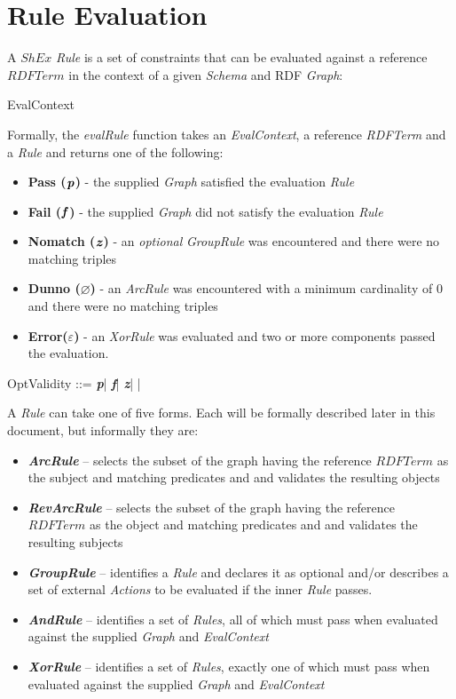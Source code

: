 \documentclass[fuzz]{llncs}
\def\pass{\textbf{\textit{p}}}
\def\fail{\textbf{\textit{f}}}
\def\dunno{\varnothing}
\def\error{\varepsilon}
\def\nomatch{\textbf{\textit{z}}}
\def\zc{\textit}
\begin{document}
\section{Rule Evaluation}
A $ShEx$ \zc{Rule} is a set of constraints that can be evaluated against a reference ${RDFTerm}$
 in the context of a given \zc{Schema} and RDF \zc{Graph}:
\begin{zed}
EvalContext  \\
\end{zed}


Formally, the \zc{evalRule} function takes an \zc{EvalContext}, a reference \zc{RDFTerm} and a \zc{Rule} and returns one of the following:
\begin{itemize}
\item \textbf{Pass ($\pass$)} - the supplied \zc{Graph} satisfied the evaluation \zc{Rule}
\item \textbf{Fail ($\fail$)} - the supplied \zc{Graph} did not satisfy the evaluation \zc{Rule}
\item \textbf{Nomatch ($\nomatch$)} - an \zc{optional} \zc{GroupRule} was encountered and there were no matching triples
\item \textbf{Dunno ($\dunno$)} - an \zc{ArcRule} was encountered with a minimum cardinality of 0 and there were no matching triples
\item \textbf{Error($\error$)} - an \zc{XorRule} was evaluated and two or more components passed the evaluation.
\end{itemize}
\begin{zed}
OptValidity ::= \pass | \fail | \nomatch | \dunno | \error \\
\end{zed}
A  \zc{Rule} can take one of five forms. Each will be formally described later in this
document, but informally they are:
\begin{itemize}
\item \textbf{\zc{ArcRule}} -- selects the subset of the graph having the reference ${RDFTerm}$ as the subject and matching predicates and and validates the resulting objects
\item \textbf{\zc{RevArcRule}} -- selects the subset of the graph having the reference ${RDFTerm}$ as the object and matching predicates and and validates the resulting subjects 
\item \textbf{\zc{GroupRule}} -- identifies a \zc{Rule} and declares it as optional and/or
describes a set of external \zc{Actions} to be evaluated if the inner \zc{Rule} passes.
\item \textbf{\zc{AndRule}} -- identifies a set of \zc{Rules}, all of which must pass when
evaluated against the supplied \zc{Graph} and \zc{EvalContext}
\item \textbf{\zc{XorRule}} -- identifies a set of \zc{Rules}, exactly one of which must pass when
evaluated against the supplied \zc{Graph} and \zc{EvalContext}
\end{itemize}
\end{document}

